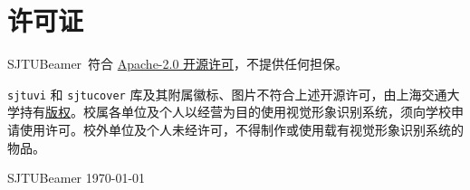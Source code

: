 \documentclass[
    UTF8,
    heading=true,
    12pt,
    a4paper
]{ctexrep}
\def\themename{\textsf{SJTUBeamer}}
\begin{document}
    \chapter*{许可证}

    \themename\ 符合 \href{https://github.com/sjtug/SJTUBeamer/blob/main/LICENSE}{Apache-2.0 开源许可}，不提供任何担保。

    \texttt{sjtuvi} 和 \texttt{sjtucover} 库及其附属徽标、图片不符合上述开源许可，由上海交通大学持有\href{https://vi.sjtu.edu.cn/index.php/articles/bulletin/16}{版权}。校属各单位及个人以经营为目的使用视觉形象识别系统，须向学校申请使用许可。校外单位及个人未经许可，不得制作或使用载有视觉形象识别系统的物品。

    \vfill

    {\small \themename{} \hfill \today}
\end{document}
